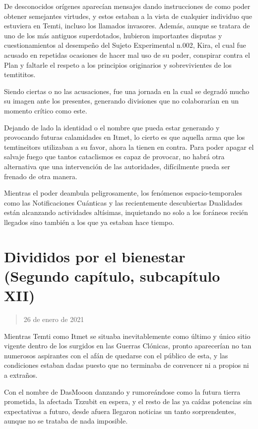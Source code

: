 \documentclass[
  spanish,
]{book}
\begin{document}
De desconocidos orígenes aparecían mensajes dando instrucciones de como poder obtener semejantes virtudes, y estos estaban a la vista de cualquier individuo que estuviera en Temti, incluso los llamados invasores. Además, aunque se tratara de uno de los más antiguos superdotados, hubieron importantes disputas y cuestionamientos al desempeño del Sujeto Experimental n.002, Kira, el cual fue acusado en repetidas ocasiones de hacer mal uso de su poder, conspirar contra el Plan y faltarle el respeto a los principios originarios y sobrevivientes de los temtititos.

Siendo ciertas o no las acusaciones, fue una jornada en la cual se degradó mucho su imagen ante los presentes, generando divisiones que no colaborarían en un momento crítico como este.

Dejando de lado la identidad o el nombre que pueda estar generando y provocando futuras calamidades en Itmet, lo cierto es que aquella arma que los temtineitors utilizaban a su favor, ahora la tienen en contra. Para poder apagar el salvaje fuego que tantos cataclismos es capaz de provocar, no habrá otra alternativa que una intervención de las autoridades, difícilmente pueda ser frenado de otra manera.

Mientras el poder deambula peligrosamente, los fenómenos espacio-temporales como las Notificaciones Cuánticas y las recientemente descubiertas Dualidades están alcanzando actividades altísimas, inquietando no solo a los foráneos recién llegados sino también a los que ya estaban hace tiempo.

\hypertarget{divididos-por-el-bienestar-segundo-capuxedtulo-subcapuxedtulo-xii}{%
\section{Divididos por el bienestar (Segundo capítulo, subcapítulo XII)}\label{divididos-por-el-bienestar-segundo-capuxedtulo-subcapuxedtulo-xii}}

\begin{quote}
26 de enero de 2021
\end{quote}

Mientras Temti como Itmet se situaba inevitablemente como último y único sitio vigente dentro de los surgidos en las Guerras Clónicas, pronto aparecerían no tan numerosos aspirantes con el afán de quedarse con el público de esta, y las condiciones estaban dadas puesto que no terminaba de convencer ni a propios ni a extraños.

Con el nombre de DasMooon danzando y rumoreándose como la futura tierra prometida, la afectada Tzzubit en espera, y el resto de las ya caídas potencias sin expectativas a futuro, desde afuera llegaron noticias un tanto sorprendentes, aunque no se trataba de nada imposible.
\end{document}
